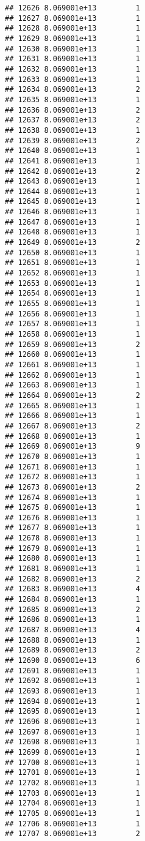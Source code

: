 \documentclass[
]{article}
\begin{document}
\begin{verbatim}
## 12626 8.069001e+13         1
## 12627 8.069001e+13         1
## 12628 8.069001e+13         1
## 12629 8.069001e+13         1
## 12630 8.069001e+13         1
## 12631 8.069001e+13         1
## 12632 8.069001e+13         1
## 12633 8.069001e+13         1
## 12634 8.069001e+13         2
## 12635 8.069001e+13         1
## 12636 8.069001e+13         2
## 12637 8.069001e+13         2
## 12638 8.069001e+13         1
## 12639 8.069001e+13         2
## 12640 8.069001e+13         1
## 12641 8.069001e+13         1
## 12642 8.069001e+13         2
## 12643 8.069001e+13         1
## 12644 8.069001e+13         1
## 12645 8.069001e+13         1
## 12646 8.069001e+13         1
## 12647 8.069001e+13         1
## 12648 8.069001e+13         1
## 12649 8.069001e+13         2
## 12650 8.069001e+13         1
## 12651 8.069001e+13         1
## 12652 8.069001e+13         1
## 12653 8.069001e+13         1
## 12654 8.069001e+13         1
## 12655 8.069001e+13         1
## 12656 8.069001e+13         1
## 12657 8.069001e+13         1
## 12658 8.069001e+13         1
## 12659 8.069001e+13         2
## 12660 8.069001e+13         1
## 12661 8.069001e+13         1
## 12662 8.069001e+13         1
## 12663 8.069001e+13         1
## 12664 8.069001e+13         2
## 12665 8.069001e+13         1
## 12666 8.069001e+13         1
## 12667 8.069001e+13         2
## 12668 8.069001e+13         1
## 12669 8.069001e+13         9
## 12670 8.069001e+13         1
## 12671 8.069001e+13         1
## 12672 8.069001e+13         1
## 12673 8.069001e+13         2
## 12674 8.069001e+13         1
## 12675 8.069001e+13         1
## 12676 8.069001e+13         1
## 12677 8.069001e+13         1
## 12678 8.069001e+13         1
## 12679 8.069001e+13         1
## 12680 8.069001e+13         1
## 12681 8.069001e+13         1
## 12682 8.069001e+13         2
## 12683 8.069001e+13         4
## 12684 8.069001e+13         1
## 12685 8.069001e+13         2
## 12686 8.069001e+13         1
## 12687 8.069001e+13         4
## 12688 8.069001e+13         1
## 12689 8.069001e+13         2
## 12690 8.069001e+13         6
## 12691 8.069001e+13         1
## 12692 8.069001e+13         1
## 12693 8.069001e+13         1
## 12694 8.069001e+13         1
## 12695 8.069001e+13         1
## 12696 8.069001e+13         1
## 12697 8.069001e+13         1
## 12698 8.069001e+13         1
## 12699 8.069001e+13         1
## 12700 8.069001e+13         1
## 12701 8.069001e+13         1
## 12702 8.069001e+13         1
## 12703 8.069001e+13         1
## 12704 8.069001e+13         1
## 12705 8.069001e+13         1
## 12706 8.069001e+13         1
## 12707 8.069001e+13         2

\end{verbatim}
\end{document}
